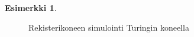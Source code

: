 \documentclass[a4paper, 12pt]{article}
\theoremstyle{definition}
\newtheorem{example}[mydef]{Esimerkki}
\theoremstyle{plain}
\begin{document}
\begin{example}
\begin{figure}[tb]
\caption{Rekisterikoneen simulointi Turingin koneella}
\end{figure}
\begin{figure}[tb] 
\centering

\end{figure}
\end{example}
\end{document}
